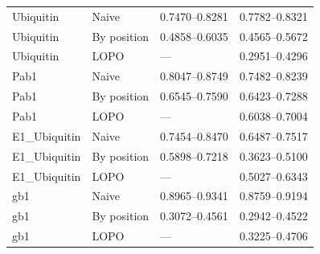 \documentclass[10pt, british, luatex]{beamer}
\begin{document}
\begin{frame}
\begin{tabular*}{\linewidth}{@{\extracolsep{\fill}}llll}
		Ubiquitin      & Naive       & \numrange{0.7470}{0.8281}        & \numrange{0.7782}{0.8321}         \\
		Ubiquitin      & By position & \numrange{0.4858}{0.6035}        & \numrange{0.4565}{0.5672}         \\
		Ubiquitin      & LOPO        & ---                              & \numrange{0.2951}{0.4296}         \\
		Pab1           & Naive       & \numrange{0.8047}{0.8749}        & \numrange{0.7482}{0.8239}         \\
		Pab1           & By position & \numrange{0.6545}{0.7590}        & \numrange{0.6423}{0.7288}         \\
		Pab1           & LOPO        & ---                              & \numrange{0.6038}{0.7004}         \\
		E1\_Ubiquitin  & Naive       & \numrange{0.7454}{0.8470}        & \numrange{0.6487}{0.7517}         \\
		E1\_Ubiquitin  & By position & \numrange{0.5898}{0.7218}        & \numrange{0.3623}{0.5100}         \\
		E1\_Ubiquitin  & LOPO        & ---                              & \numrange{0.5027}{0.6343}         \\
		gb1            & Naive       & \numrange{0.8965}{0.9341}        & \numrange{0.8759}{0.9194}         \\
		gb1            & By position & \numrange{0.3072}{0.4561}        & \numrange{0.2942}{0.4522}         \\
		gb1            & LOPO        & ---                              & \numrange{0.3225}{0.4706}         \\
		\bottomrule
	\end{tabular*}%
\end{frame}
\end{document}
